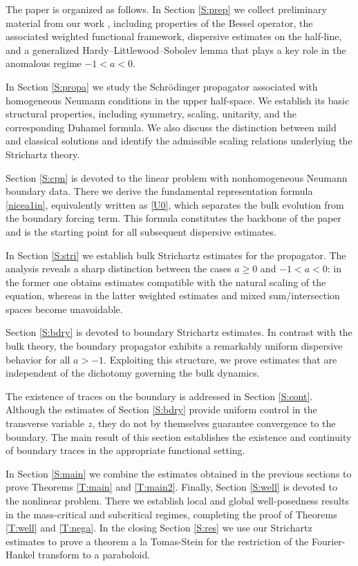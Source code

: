 \documentclass[11pt,letter]{amsart}
\numberwithin{equation}{section}
\numberwithin{equation}{section}
\begin{document}
\vskip 0.2in

The paper is organized as follows. In Section \ref{S:prep} we collect preliminary material from our work \cite{GS}, including properties of the Bessel operator, the associated weighted functional framework, dispersive estimates on the half-line, and a generalized Hardy--Littlewood--Sobolev lemma that plays a key role in the anomalous regime $-1<a<0$.

In Section \ref{S:propa} we study the Schr\"odinger propagator associated with homogeneous Neumann conditions in the upper half-space. We establish its basic structural properties, including symmetry, scaling, unitarity, and the corresponding Duhamel formula. We also discuss the distinction between mild and classical solutions and identify the admissible scaling relations underlying the Strichartz theory.

Section \ref{S:cpn} is devoted to the linear problem with nonhomogeneous Neumann boundary data. There we derive the fundamental representation formula \eqref{nicea1in}, equivalently written as \eqref{U0}, which separates the bulk evolution from the boundary forcing term. This formula constitutes the backbone of the paper and is the starting point for all subsequent dispersive estimates.

In Section \ref{S:stri} we establish bulk Strichartz estimates for the propagator. The analysis reveals a sharp distinction between the cases \(a\geq0\) and \(-1<a<0\): in the former one obtains estimates compatible with the natural scaling of the equation, whereas in the latter weighted estimates and mixed sum/intersection spaces become unavoidable.

Section \ref{S:bdry} is devoted to boundary Strichartz estimates. In contrast with the bulk theory, the boundary propagator exhibits a remarkably uniform dispersive behavior for all $a>-1$. Exploiting this structure, we prove estimates that are independent of the dichotomy governing the bulk dynamics.

The existence of traces on the boundary is addressed in Section \ref{S:cont}. Although the estimates of Section \ref{S:bdry} provide uniform control in the transverse variable $z$, they do not by themselves guarantee convergence to the boundary. The main result of this section establishes the existence and continuity of boundary traces in the appropriate functional setting.

In Section \ref{S:main} we combine the estimates obtained in the previous sections to prove Theorems \ref{T:main} and \ref{T:main2}. Finally, Section \ref{S:well} is devoted to the nonlinear problem. There we establish local and global well-posedness results in the mass-critical and subcritical regimes, completing the proof of Theorems \ref{T:well}
 and \ref{T:nega}. In the closing Section \ref{S:res} we use our Strichartz estimates to prove a theorem a la Tomas-Stein for the restriction of the Fourier-Hankel transform to a paraboloid.
\end{document}
